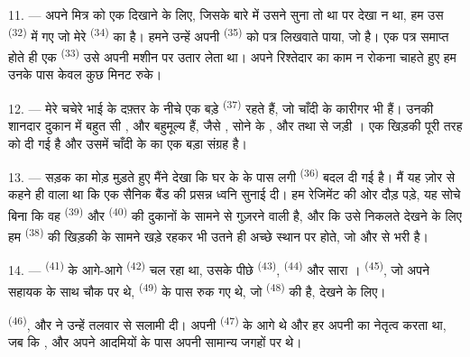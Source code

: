 \VUsaut{3.0mm}

11. --- अपने मित्र को एक  दिखाने के लिए, जिसके बारे में उसने
सुना तो था पर देखा न था, हम उस  \textsuperscript{(32)} में गए जो मेरे
 \textsuperscript{(34)} का है। हमने उन्हें अपनी
 \textsuperscript{(35)} को पत्र लिखवाते पाया, जो 
है। एक पत्र समाप्त होते ही एक  \textsuperscript{(33)} उसे अपनी मशीन
पर उतार लेता था। अपने रिश्तेदार का काम न रोकना चाहते हुए हम उनके पास केवल कुछ
मिनट रुके।

12. --- मेरे चचेरे भाई के दफ़्तर के नीचे एक बड़े
 \textsuperscript{(37)} रहते हैं, जो चाँदी के कारीगर भी
हैं। उनकी शानदार दुकान में बहुत सी ,
 और बहुमूल्य  हैं, जैसे ,
सोने के ,  और  तथा
 से जड़ी । एक खिड़की पूरी तरह
 को दी गई है और उसमें चाँदी के  का
एक बड़ा संग्रह है।

13. --- सड़क का मोड़ मुड़ते हुए मैंने देखा कि घर के  के पास लगी
 \textsuperscript{(36)} बदल दी गई है। मैं यह ज़ोर से कहने ही
वाला था कि एक सैनिक बैंड की प्रसन्न ध्वनि सुनाई दी। हम रेजिमेंट की ओर दौड़ पड़े,
यह सोचे बिना कि वह  \textsuperscript{(39)} और
 \textsuperscript{(40)} की दुकानों के सामने से गुज़रने वाली
है, और कि उसे निकलते देखने के लिए हम  \textsuperscript{(38)} की
खिड़की के सामने खड़े रहकर भी उतने ही अच्छे स्थान पर होते, जो
 और  से भरी है।

\VUsaut{3.0mm}

14. ---  \textsuperscript{(41)} के आगे-आगे
 \textsuperscript{(42)} चल रहा था, उसके पीछे
 \textsuperscript{(43)},  \textsuperscript{(44)}
और सारा ।  \textsuperscript{(45)}, जो अपने सहायक के साथ
चौक पर थे,  \textsuperscript{(49)} के पास रुक गए थे, जो
 \textsuperscript{(48)} की है,  देखने के लिए।

 \textsuperscript{(46)},  और
 ने उन्हें तलवार से सलामी दी।  अपनी
 \textsuperscript{(47)} के आगे थे और हर  अपनी
 का नेतृत्व करता था, जब कि ,
 और  अपने आदमियों के पास अपनी
सामान्य जगहों पर थे।

